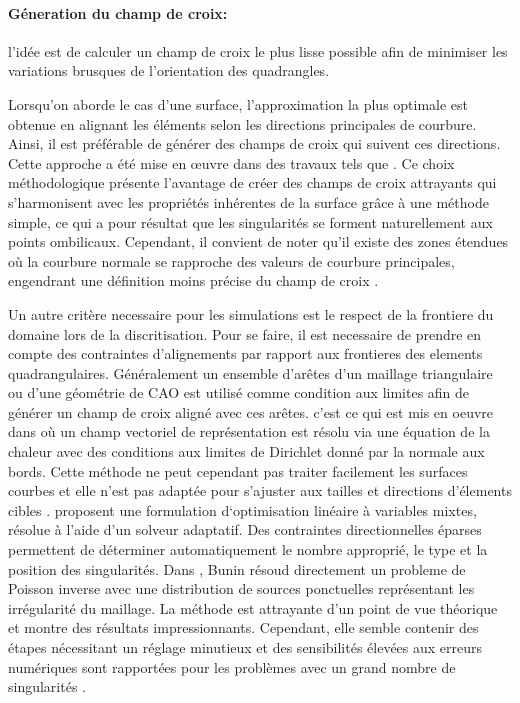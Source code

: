 \paragraph{Géneration du champ de croix:} l'idée est de calculer un champ de croix le plus lisse possible afin de minimiser les variations brusques de l'orientation des quadrangles. 

Lorsqu'on aborde le cas d'une surface, l'approximation la plus optimale est obtenue en alignant les éléments selon les directions principales de courbure. Ainsi, il est préférable de générer des champs de croix qui suivent ces directions. Cette approche a été mise en œuvre dans des travaux tels que \cite{alliez2003anisotropic, marinov2004direct, kalberer2007quadcover}. Ce choix méthodologique présente l'avantage de créer des champs de croix attrayants qui s'harmonisent avec les propriétés inhérentes de la surface grâce à une méthode simple, ce qui a pour résultat que les singularités se forment naturellement aux points ombilicaux. Cependant, il convient de noter qu'il existe des zones étendues où la courbure normale se rapproche des valeurs de courbure principales, engendrant une définition moins précise du champ de croix \cite{fogg2015automatic}.

Un autre critère necessaire pour les simulations est le respect de la frontiere du domaine lors de la discritisation. Pour se faire, il est necessaire de prendre en compte des contraintes d'alignements par rapport aux frontieres des elements quadrangulaires. Généralement un ensemble d'arêtes d'un maillage triangulaire ou d'une géométrie de CAO est utilisé comme condition aux limites afin de générer un champ de croix aligné avec ces  arêtes. c'est ce qui est mis en oeuvre dans \cite{kowalski2013pde, palacios2007rotational} où un champ vectoriel de représentation est résolu via une équation de la chaleur avec des conditions aux limites de Dirichlet donné par la normale aux bords. Cette méthode ne peut cependant pas traiter facilement les surfaces courbes et elle n'est pas adaptée pour s'ajuster aux tailles et directions d'élements cibles \cite{fogg2015automatic}. \cite{bommes2009mixed} proposent une formulation d`optimisation linéaire à variables mixtes, résolue à l'aide d'un solveur adaptatif. Des contraintes directionnelles éparses permettent de déterminer automatiquement le nombre approprié, le type et la position des singularités. Dans \cite{bunin2008towards}, Bunin résoud directement un probleme de Poisson inverse avec une distribution de sources ponctuelles représentant les irrégularité du maillage. La méthode est attrayante d'un point de vue théorique et montre des résultats impressionnants. Cependant, elle semble contenir des étapes nécessitant un réglage minutieux et des sensibilités élevées aux erreurs numériques sont rapportées pour les problèmes avec un grand nombre de singularités \cite{fogg2015automatic}.


